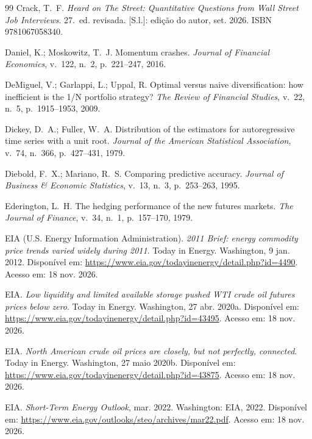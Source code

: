 \begin{thebibliography}{99}
Crack, T.~F. \emph{Heard on The Street: Quantitative Questions from Wall Street Job Interviews}. 27.~ed. revisada. [S.l.]: edição do autor, set. 2026. ISBN 9781067058340.

Daniel, K.; Moskowitz, T.~J. Momentum crashes. \emph{Journal of Financial Economics}, v.~122, n.~2, p.~221--247, 2016.

DeMiguel, V.; Garlappi, L.; Uppal, R. Optimal versus naive diversification: how inefficient is the 1/N portfolio strategy? \emph{The Review of Financial Studies}, v.~22, n.~5, p.~1915--1953, 2009.

Dickey, D.~A.; Fuller, W.~A. Distribution of the estimators for autoregressive time series with a unit root. \emph{Journal of the American Statistical Association}, v.~74, n.~366, p.~427--431, 1979.

Diebold, F.~X.; Mariano, R.~S. Comparing predictive accuracy. \emph{Journal of Business \& Economic Statistics}, v.~13, n.~3, p.~253--263, 1995.

Ederington, L.~H. The hedging performance of the new futures markets. \emph{The Journal of Finance}, v.~34, n.~1, p.~157--170, 1979.

EIA (U.S. Energy Information Administration). \emph{2011 Brief: energy commodity price trends varied widely during 2011}. Today in Energy. Washington, 9 jan. 2012. Disponível em: \url{https://www.eia.gov/todayinenergy/detail.php?id=4490}. Acesso em: 18 nov. 2026.

EIA. \emph{Low liquidity and limited available storage pushed WTI crude oil futures prices below zero}. Today in Energy. Washington, 27 abr. 2020a. Disponível em: \url{https://www.eia.gov/todayinenergy/detail.php?id=43495}. Acesso em: 18 nov. 2026.

EIA. \emph{North American crude oil prices are closely, but not perfectly, connected}. Today in Energy. Washington, 27 maio 2020b. Disponível em: \url{https://www.eia.gov/todayinenergy/detail.php?id=43875}. Acesso em: 18 nov. 2026.

EIA. \emph{Short-Term Energy Outlook}, mar. 2022. Washington: EIA, 2022. Disponível em: \url{https://www.eia.gov/outlooks/steo/archives/mar22.pdf}. Acesso em: 18 nov. 2026.


\end{thebibliography}
